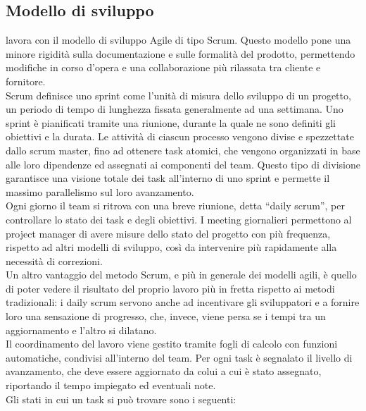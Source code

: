    \subsection{Modello di sviluppo}
   \nomeAzienda{} lavora con il modello di sviluppo Agile di tipo Scrum. Questo modello pone una minore rigidità sulla documentazione e sulle formalità del prodotto, permettendo modifiche in corso d'opera e una collaborazione più rilassata tra cliente e fornitore.
   \\
   Scrum definisce uno sprint come l'unità di misura dello sviluppo di un progetto, un periodo di tempo di lunghezza fissata generalmente ad una settimana.
   Uno sprint è pianificati tramite una riunione, durante la quale ne sono definiti gli obiettivi e la durata. Le attività di ciascun processo vengono divise e spezzettate dallo scrum master, fino ad ottenere task atomici, che vengono organizzati in base alle loro dipendenze ed assegnati ai componenti del team. Questo tipo di divisione garantisce una visione totale dei task all'interno di uno sprint e permette il massimo parallelismo sul loro avanzamento.
   \\
   Ogni giorno il team si ritrova con una breve riunione, detta ``daily scrum'', per controllare lo stato dei task e degli obiettivi. I meeting giornalieri permettono al project manager di avere misure dello stato del progetto con più frequenza, rispetto ad altri modelli di sviluppo, così da intervenire più rapidamente alla necessità di correzioni.
   \\
   Un altro vantaggio del metodo Scrum, e più in generale dei modelli agili, è quello di poter vedere il risultato del proprio lavoro più in fretta rispetto ai metodi tradizionali: i daily scrum servono anche ad incentivare gli sviluppatori e a fornire loro una sensazione di progresso, che, invece, viene persa se i tempi tra un aggiornamento e l'altro si dilatano.
   \\
   Il coordinamento del lavoro viene gestito tramite fogli di calcolo con funzioni automatiche, condivisi all'interno del team. Per ogni task è segnalato il livello di avanzamento, che deve essere aggiornato da colui a cui è stato assegnato, riportando il tempo impiegato ed eventuali note.
   \\
   Gli stati in cui un task si può trovare sono i seguenti:
